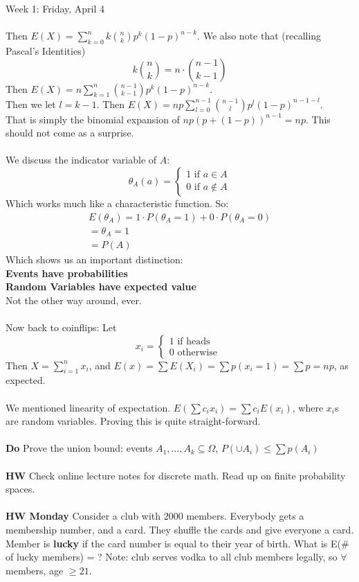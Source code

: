 \documentclass[12pt]{article}
\theoremstyle{remark}
\newcommand{\IF}{\text{ if }}
\newcommand{\ow}{\text{ otherwise }}
\begin{document}
\begin{section}{Week 1: Friday, April 4}
\\\\Then $E(X) = \sum_{k=0}^{n} k {n\choose k} p^k (1-p)^{n-k}$. We also note that (recalling Pascal's Identities) $$k {n \choose k} = n \cdot {n-1 \choose k-1}$$
Then $E(X) = n \sum_{k=1}^n {n-1 \choose k-1} p^k (1-p)^{n-k}$. \\Then we let $l = k-1$. Then $E(X) = np\sum_{l=0}^{n-1}{n-1 \choose l} p^l (1-p)^{n-1-l}$. 
\\That is simply the binomial expansion of $np(p+(1-p))^{n-1} = np$. This should not come as a surprise.
\\\\
We discuss the indicator variable of $A$:
$$\theta_A(a) = \begin{cases}1\IF a\in A \\0 \IF a\notin A \end{cases}$$
Which works much like a characteristic function. So: 
\begin{align*} E(\theta_A) = 1 \cdot P(\theta_A = 1) + 0 \cdot P(\theta_A = 0)
\\ = \theta_A = 1
\\ = P(A)
\end{align*}
Which shows us an important distinction:
\\\textbf{Events have probabilities}
\\\textbf{Random Variables have expected value}
\\Not the other way around, ever.
\\\\Now back to coinflips: Let $$x_i = \begin{cases} 1\text{ if heads}\\ 0\ow \end{cases}$$ Then $X = \sum_{i=1}^{n} x_i$, and $E(x) = \sum E(X_i) = \sum p(x_i = 1) = \sum p = np$, as expected.
\\\\We mentioned linearity of expectation. $E(\sum c_ix_i)= \sum c_i E(x_i)$, where $x_i$s are random variables. Proving this is quite straight-forward.
\\\\\textbf{Do} Prove the union bound: events $A_1,\ldots,A_k \subseteq \Omega$, $P(\cup A_i) \leq \sum p(A_i)$
\\\\\textbf{HW} Check online lecture  notes for discrete math. Read up on finite probability spaces.
\\\\\textbf{HW Monday} Consider a club with $2000$ members. Everybody gets a membership number, and a card. They shuffle the cards and give everyone a card. Member is \textbf{lucky} if the card number is equal to their year of birth. What is E(\# of lucky members) = ? Note: club serves vodka to all club members legally, so $\forall$ members, age $\geq 21$. 

\end{section}
\end{document}
